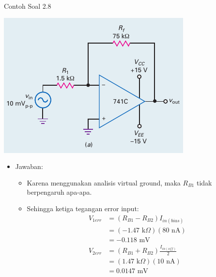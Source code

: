 \begin{frame}[t]{Contoh Soal 2.8}
	\begin{multicols}{2}
		\begin{center}
			\includegraphics[width=\linewidth]{gambar/fig-16.17a}
		\end{center}
		\columnbreak
		\begin{itemize}
			\item Jawaban:
			\begin{itemize}
				\item Karena menggunakan analisis virtual ground, maka $ R_{B1} $ tidak berpengaruh apa-apa.
				\item Sehingga ketiga tegangan error input:
				\begin{align*}
					V_{1err} &= (R_{B1} - R_{B2})I_{in(bias)} \\
					&= ( - 1.47 \text{ k}\Omega )(80 \text{ nA}) \\
					&= -0.118 \text{ mV} \\
					V_{2err} &= (R_{B1} + R_{B2}) \frac{I_{in(off)}}{2} \\
					&= ( 1.47 \text{ k}\Omega )(10 \text{ nA}) \\
					&= 0.0147 \text{ mV} \\
				\end{align*}
			\end{itemize}
		\end{itemize}
	\end{multicols}
\end{frame}


